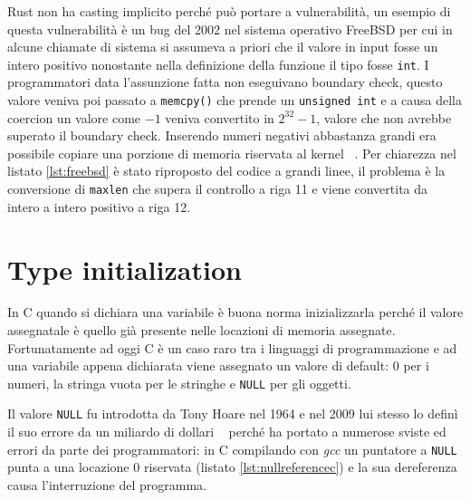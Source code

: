 \documentclass[Lau,binding=0.6cm]{sapthesis}
\newcommand{\textcode}[1]{\colorbox{backcolour}{\texttt{#1}}}
\begin{document}



Rust non ha casting implicito perché può portare a vulnerabilità, un esempio di questa vulnerabilità è un bug del 2002 nel sistema operativo FreeBSD per cui in alcune chiamate di sistema si assumeva a priori che il valore in input fosse un intero positivo nonostante nella definizione della funzione il tipo fosse \textcode{int}.
I programmatori data l'assunzione fatta non eseguivano boundary check, questo valore veniva poi passato a \textcode{memcpy()} che prende un \textcode{unsigned int} e a causa della coercion un valore come $ -1 $ veniva convertito in $ 2^{32}-1 $, valore che non avrebbe superato il boundary check.
Inserendo numeri negativi abbastanza grandi era possibile copiare una porzione di memoria riservata al kernel ~\cite{freeBSD_vulnerability}.
Per chiarezza nel listato \ref{lst:freebsd} è stato riproposto del codice a grandi linee, il problema è la conversione di \texttt{maxlen} che supera il controllo a riga 11 e viene convertita da intero a intero positivo a riga 12. 

 

\section{Type initialization} \label{sec:type_initialization}
In C quando si dichiara una variabile è buona norma inizializzarla perché il valore assegnatale è quello già presente nelle locazioni di memoria assegnate.
Fortunatamente ad oggi C è un caso raro tra i linguaggi di programmazione e ad una variabile appena dichiarata viene assegnato un valore di default: $ 0 $ per i numeri, la stringa vuota per le stringhe e \textcode{NULL} per gli oggetti.

Il valore \textcode{NULL} fu introdotta da Tony Hoare nel 1964 e nel 2009 lui stesso lo definì il suo errore da un miliardo di dollari ~\cite{hoare:billion_dollar_mistake} perché ha portato a numerose sviste ed errori da parte dei programmatori: in C compilando con \textit{gcc} un puntatore a \textcode{NULL} punta a una locazione $ 0 $ riservata (listato \ref{lst:nullreferencec}) e la sua dereferenza causa l'interruzione del programma. 



\end{document}
